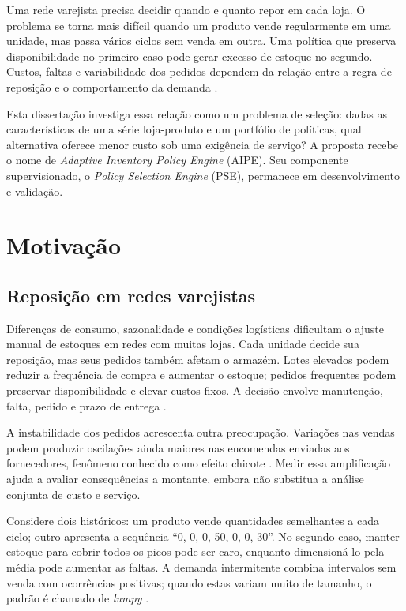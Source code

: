 
Uma rede varejista precisa decidir quando e quanto repor em cada loja. O problema se torna mais difícil quando um produto vende regularmente em uma unidade, mas passa vários ciclos sem venda em outra. Uma política que preserva disponibilidade no primeiro caso pode gerar excesso de estoque no segundo. Custos, faltas e variabilidade dos pedidos dependem da relação entre a regra de reposição e o comportamento da demanda \citep{Axsater2006InventoryControl,Syntetos2005Categorization}.

Esta dissertação investiga essa relação como um problema de seleção: dadas as características de uma série loja-produto e um portfólio de políticas, qual alternativa oferece menor custo sob uma exigência de serviço? A proposta recebe o nome de \textit{Adaptive Inventory Policy Engine} (AIPE). Seu componente supervisionado, o \textit{Policy Selection Engine} (PSE), permanece em desenvolvimento e validação.

\section{Motivação}

\subsection{Reposição em redes varejistas}

Diferenças de consumo, sazonalidade e condições logísticas dificultam o ajuste manual de estoques em redes com muitas lojas. Cada unidade decide sua reposição, mas seus pedidos também afetam o armazém. Lotes elevados podem reduzir a frequência de compra e aumentar o estoque; pedidos frequentes podem preservar disponibilidade e elevar custos fixos. A decisão envolve manutenção, falta, pedido e prazo de entrega \citep{Axsater2006InventoryControl,Zipkin2000FoundationsInventory}.

A instabilidade dos pedidos acrescenta outra preocupação. Variações nas vendas podem produzir oscilações ainda maiores nas encomendas enviadas aos fornecedores, fenômeno conhecido como efeito chicote \citep{LeePadmanabhanWhang1997Bullwhip}. Medir essa amplificação ajuda a avaliar consequências a montante, embora não substitua a análise conjunta de custo e serviço.

Considere dois históricos: um produto vende quantidades semelhantes a cada ciclo; outro apresenta a sequência ``0, 0, 0, 50, 0, 0, 30''. No segundo caso, manter estoque para cobrir todos os picos pode ser caro, enquanto dimensioná-lo pela média pode aumentar as faltas. A demanda intermitente combina intervalos sem venda com ocorrências positivas; quando estas variam muito de tamanho, o padrão é chamado de \textit{lumpy} \citep{Croston1972ForecastingIntermittentDemand,Syntetos2005Categorization,Boylan2008Intermittent}.

